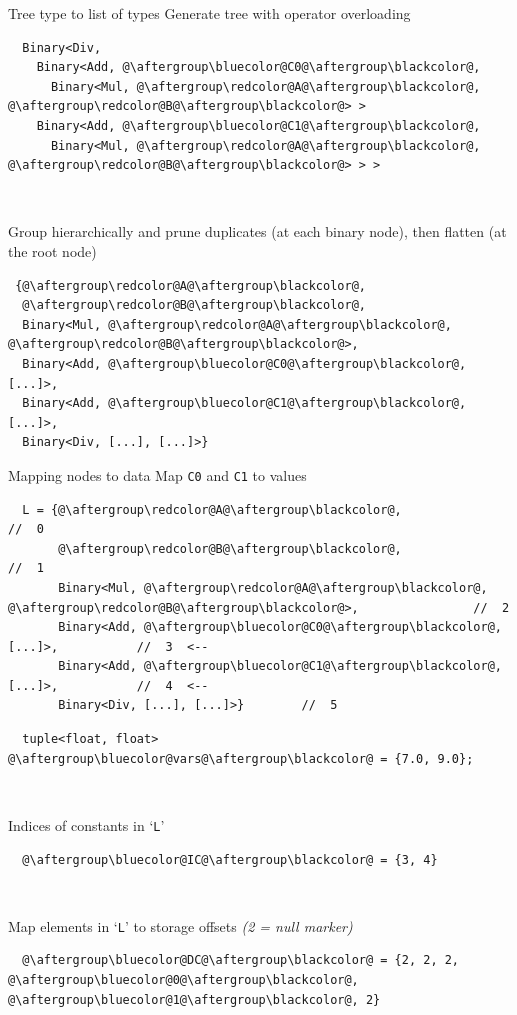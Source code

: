 \documentclass[xcolor=dvipsnames]{beamer}
\begin{document}
\begin{frame}[fragile]{Tree type to list of types}
Generate tree with operator overloading
\begin{lstlisting}
  Binary<Div,
    Binary<Add, @\aftergroup\bluecolor@C0@\aftergroup\blackcolor@,
      Binary<Mul, @\aftergroup\redcolor@A@\aftergroup\blackcolor@, @\aftergroup\redcolor@B@\aftergroup\blackcolor@> >
    Binary<Add, @\aftergroup\bluecolor@C1@\aftergroup\blackcolor@,
      Binary<Mul, @\aftergroup\redcolor@A@\aftergroup\blackcolor@, @\aftergroup\redcolor@B@\aftergroup\blackcolor@> > >
\end{lstlisting}

~

Group hierarchically and prune duplicates (at each binary node),\newline
then flatten (at the root node)
\begin{lstlisting}
 {@\aftergroup\redcolor@A@\aftergroup\blackcolor@,
  @\aftergroup\redcolor@B@\aftergroup\blackcolor@,
  Binary<Mul, @\aftergroup\redcolor@A@\aftergroup\blackcolor@, @\aftergroup\redcolor@B@\aftergroup\blackcolor@>,
  Binary<Add, @\aftergroup\bluecolor@C0@\aftergroup\blackcolor@, [...]>,
  Binary<Add, @\aftergroup\bluecolor@C1@\aftergroup\blackcolor@, [...]>,
  Binary<Div, [...], [...]>}
\end{lstlisting}
\end{frame}


\begin{frame}[fragile]{Mapping nodes to data}
Map {\color{blue}\texttt{C0}} and {\color{blue}\texttt{C1}} to values
\begin{lstlisting}
  L = {@\aftergroup\redcolor@A@\aftergroup\blackcolor@,                                //  0
       @\aftergroup\redcolor@B@\aftergroup\blackcolor@,                                //  1
       Binary<Mul, @\aftergroup\redcolor@A@\aftergroup\blackcolor@, @\aftergroup\redcolor@B@\aftergroup\blackcolor@>,                //  2
       Binary<Add, @\aftergroup\bluecolor@C0@\aftergroup\blackcolor@, [...]>,           //  3  <--
       Binary<Add, @\aftergroup\bluecolor@C1@\aftergroup\blackcolor@, [...]>,           //  4  <--
       Binary<Div, [...], [...]>}        //  5
\end{lstlisting}
\begin{lstlisting}
  tuple<float, float> @\aftergroup\bluecolor@vars@\aftergroup\blackcolor@ = {7.0, 9.0};
\end{lstlisting}

~

Indices of constants in `\texttt{L}'
\begin{lstlisting}
  @\aftergroup\bluecolor@IC@\aftergroup\blackcolor@ = {3, 4}
\end{lstlisting}

~

Map elements in `\texttt{L}' to storage offsets \emph{(2 = null marker)}
\begin{lstlisting}
  @\aftergroup\bluecolor@DC@\aftergroup\blackcolor@ = {2, 2, 2, @\aftergroup\bluecolor@0@\aftergroup\blackcolor@, @\aftergroup\bluecolor@1@\aftergroup\blackcolor@, 2}
\end{lstlisting}
\end{frame}
\end{document}
